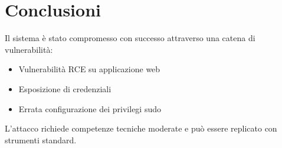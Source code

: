 \documentclass[a4paper,11pt]{article}
\begin{document}
\section{Conclusioni}

Il sistema è stato compromesso con successo attraverso una catena di vulnerabilità:

\begin{itemize}
    \item Vulnerabilità RCE su applicazione web
    \item Esposizione di credenziali
    \item Errata configurazione dei privilegi sudo
\end{itemize}

L'attacco richiede competenze tecniche moderate e può essere replicato con strumenti standard.
\end{document}

